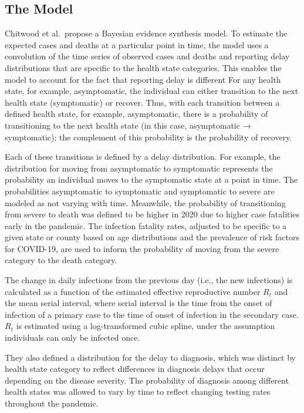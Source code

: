 \documentclass[12pt,twoside]{smiththesis}
\begin{document}
\hypertarget{the-model}{%
\subsection{The Model}\label{the-model}}

Chitwood et al.~propose a Bayesian evidence synthesis model. To estimate the expected cases and deaths at a particular point in time, the model uses a convolution of the time series of observed cases and deaths and reporting delay distributions that are specific to the health state categories. This enables the model to account for the fact that reporting delay is different For any health state, for example, asymptomatic, the individual can either transition to the next health state (symptomatic) or recover. Thus, with each transition between a defined health state, for example, asymptomatic, there is a probability of transitioning to the next health state (in this case, asymptomatic → symptomatic); the complement of this probability is the probability of recovery.

Each of these transitions is defined by a delay distribution. For example, the distribution for moving from asymptomatic to symptomatic represents the probability an individual moves to the symptomatic state at a point in time. The probabilities asymptomatic to symptomatic and symptomatic to severe are modeled as not varying with time. Meanwhile, the probability of transitioning from severe to death was defined to be higher in 2020 due to higher case fatalities early in the pandemic. The infection fatality rates, adjusted to be specific to a given state or county based on age distributions and the prevalence of risk factors for COVID-19, are used to inform the probability of moving from the severe category to the death category.

The change in daily infections from the previous day (i.e., the new infections) is calculated as a function of the estimated effective reproductive number \(R_t\) and the mean serial interval, where serial interval is the time from the onset of infection of a primary case to the time of onset of infection in the secondary case. \(R_t\) is estimated using a log-transformed cubic spline, under the assumption individuals can only be infected once.

They also defined a distribution for the delay to diagnosis, which was distinct by health state category to reflect differences in diagnosis delays that occur depending on the disease severity.
The probability of diagnosis among different health states was allowed to vary by time to reflect changing testing rates throughout the pandemic.
\end{document}
